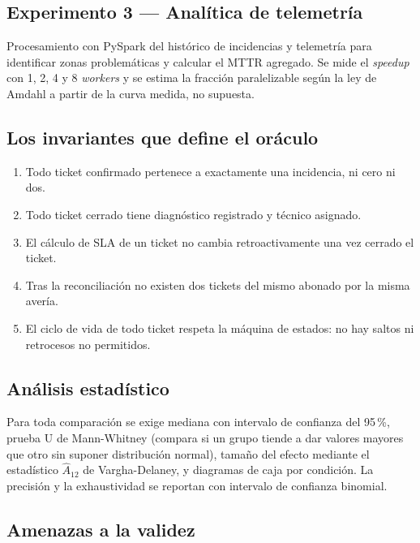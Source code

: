 \documentclass[11pt,a4paper]{article}
\begin{document}
\subsection{Experimento 3 --- Analítica de telemetría}

Procesamiento con PySpark del histórico de incidencias y telemetría para identificar zonas problemáticas y calcular el MTTR agregado. Se mide el \emph{speedup} con 1, 2, 4 y 8 \emph{workers} y se estima la fracción paralelizable según la ley de Amdahl a partir de la curva medida, no supuesta.

\subsection{Los invariantes que define el oráculo}

\begin{enumerate}[leftmargin=*,itemsep=3pt]
	\item Todo ticket confirmado pertenece a exactamente una incidencia, ni cero ni dos.
	\item Todo ticket cerrado tiene diagnóstico registrado y técnico asignado.
	\item El cálculo de SLA de un ticket no cambia retroactivamente una vez cerrado el ticket.
	\item Tras la reconciliación no existen dos tickets del mismo abonado por la misma avería.
	\item El ciclo de vida de todo ticket respeta la máquina de estados: no hay saltos ni retrocesos no permitidos.
\end{enumerate}

\subsection{Análisis estadístico}

Para toda comparación se exige mediana con intervalo de confianza del 95\,\%, prueba U de Mann-Whitney (compara si un grupo tiende a dar valores mayores que otro sin suponer distribución normal), tamaño del efecto mediante el estadístico $\hat{A}_{12}$ de Vargha-Delaney, y diagramas de caja por condición. La precisión y la exhaustividad se reportan con intervalo de confianza binomial.

\subsection{Amenazas a la validez}
\end{document}
